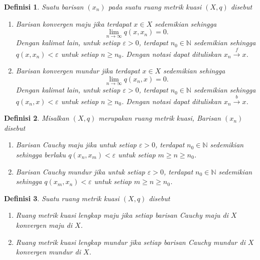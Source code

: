 \documentclass[journal]{IEEEtran}
\newtheorem{defn}{Definisi}[section]
\theoremstyle{definition}
\theoremstyle{definition}
\theoremstyle{plain}
\renewcommand{\natural}{\mathbb{N}}
\begin{document}
\begin{defn}\label{def:konvergenmajumundur}
    \cite{JuliaCollins2007} Suatu barisan $(x_n)$ pada suatu ruang metrik kuasi $(X,q)$ disebut 
    \begin{enumerate}
        \item Barisan konvergen maju jika terdapat $x\in X$ sedemikian sehingga 
    \begin{equation*}
        \lim_{n\rightarrow \infty} q(x,x_n) = 0.
    \end{equation*}
    Dengan kalimat lain, untuk setiap $\varepsilon>0$, terdapat $n_0\in \natural$ sedemikian sehingga $q(x,x_n)<\varepsilon$ untuk setiap $n\geq n_0$. Dengan notasi dapat dituliskan $x_n\xrightarrow{f} x$.
        \item Barisan konvergen mundur jika terdapat $x\in X$ sedemikian sehingga 
    \begin{equation*}
        \lim_{n\rightarrow \infty} q(x_n,x) = 0.
    \end{equation*}
    Dengan kalimat lain, untuk setiap $\varepsilon>0$, terdapat $n_0\in \natural$ sedemikian sehingga $q(x_n,x)<\varepsilon$ untuk setiap $n\geq n_0$. Dengan notasi dapat dituliskan $x_n\xrightarrow{b} x$.
    \end{enumerate}
\end{defn}
\begin{defn}\label{def:barisan-cauchy-maju-mundur}
    \cite{JuliaCollins2007} Misalkan $(X,q)$ merupakan ruang metrik kuasi, Barisan $(x_n)$ disebut 
    \begin{enumerate}
        \item Barisan Cauchy maju jika untuk setiap $\varepsilon>0$, terdapat $n_0\in \natural$ sedemikian sehingga berlaku $q(x_n,x_m)<\varepsilon$ untuk setiap $m\geq n\geq n_0$.
        \item Barisan Cauchy mundur jika untuk setiap $\varepsilon>0$, terdapat $n_0\in \natural$ sedemikian sehingga $q(x_m,x_n)<\varepsilon$ untuk setiap $m\geq n\geq n_0$.
    \end{enumerate}
\end{defn}
\begin{defn}\label{def:lengkap-maju-mundur}
    \cite{JuliaCollins2007} Suatu ruang metrik kuasi $(X,q)$ disebut 
    \begin{enumerate}
        \item Ruang metrik kuasi lengkap maju jika setiap barisan Cauchy maju di $X$ konvergen maju di $X$.
        \item Ruang metrik kuasi lengkap mundur jika setiap barisan Cauchy mundur di $X$ konvergen mundur di $X$.
    \end{enumerate}
\end{defn}
\end{document}
